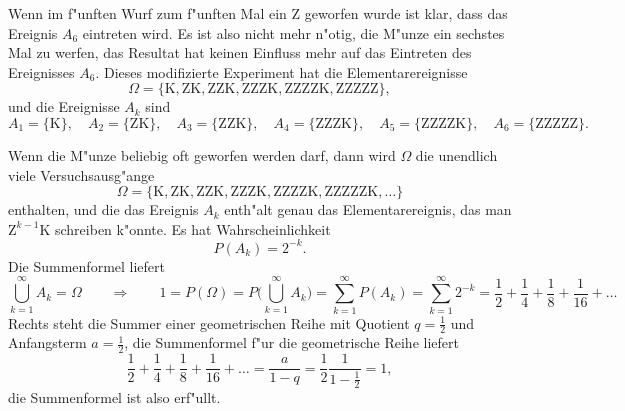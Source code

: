 \begin{loesung}
\begin{teilaufgaben}
Wenn im f"unften Wurf zum f"unften Mal ein Z geworfen wurde ist klar,
dass das Ereignis $A_6$ eintreten wird.
Es ist also nicht mehr n"otig, die M"unze ein sechstes Mal zu werfen, 
das Resultat hat keinen Einfluss mehr auf das Eintreten des Ereignisses
$A_6$.
Dieses modifizierte Experiment hat die Elementarereignisse
\[
\Omega = \{
\text{K},
\text{ZK},
\text{ZZK},
\text{ZZZK},
\text{ZZZZK},
\text{ZZZZZ}
\},
\]
und die Ereignisse $A_k$ sind
\[
A_1=\{\text{K}\},\quad
A_2=\{\text{ZK}\},\quad
A_3=\{\text{ZZK}\},\quad
A_4=\{\text{ZZZK}\},\quad
A_5=\{\text{ZZZZK}\},\quad
A_6=\{\text{ZZZZZ}\}.
\]
\item
Wenn die M"unze beliebig oft geworfen werden darf, dann wird $\Omega$ die unendlich
viele Versuchsausg"ange
\[
\Omega = \{
\text{K},
\text{ZK},
\text{ZZK},
\text{ZZZK},
\text{ZZZZK},
\text{ZZZZZK},
\dots
\}
\]
enthalten, und die das Ereignis $A_k$ enth"alt genau das Elementarereignis,
das man $\text{Z}^{k-1}\text{K}$ schreiben k"onnte.
Es hat Wahrscheinlichkeit
\[
P(A_k)=2^{-k}.
\]
Die Summenformel liefert
\[
\bigcup_{k=1}^\infty A_k=\Omega
\qquad\Rightarrow\qquad
1=P(\Omega)=P\biggl(
\bigcup_{k=1}^\infty A_k
\biggr)
=\sum_{k=1}^\infty P(A_k)=\sum_{k=1}^\infty 2^{-k}=
\frac12+\frac14+\frac18+\frac1{16}+\dots
\]
Rechts steht die Summer einer geometrischen Reihe mit Quotient $q=\frac12$ und
Anfangsterm $a=\frac12$, die Summenformel f"ur die geometrische Reihe liefert
\[
\frac12+\frac14+\frac18+\frac1{16}+\dots=\frac{a}{1-q}=\frac12\frac1{1-\frac12}=1,
\]
die Summenformel ist also erf"ullt.
\end{teilaufgaben}
\end{loesung}


